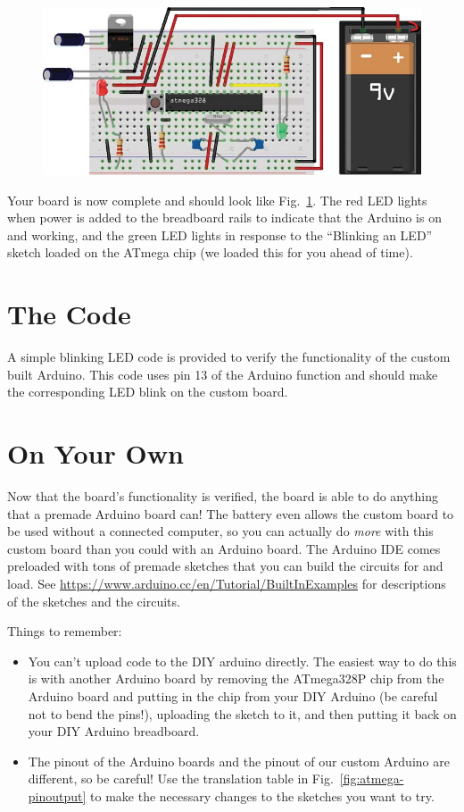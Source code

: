 \documentclass[11pt]{article}
\begin{document}
\begin{enumerate}
  \begin{figure}[H]
    \centering
    \includegraphics[width=.7\linewidth]{figures/build-6.png}
    \caption{\label{fig:build-6}}
  \end{figure}

\end{enumerate}

Your board is now complete and should look like Fig.~\ref{fig:build-6}.  The red LED
lights when power is added to the breadboard rails to indicate that the Arduino is on
and working, and the green LED lights in response to the ``Blinking an LED'' sketch
loaded on the ATmega chip (we loaded this for you ahead of time).


\section{The Code}
\label{sec-5}
A simple blinking LED code is provided to verify the functionality of the custom
built Arduino. This code uses pin 13 of the Arduino function and should make the
corresponding LED blink on the custom board.

\section{On Your Own}
\label{sec-6}
Now that the board's functionality is verified, the board is able to do anything that
a premade Arduino board can! The battery even allows the custom board to be used
without a connected computer, so you can actually do \emph{more} with this custom
board than you could with an Arduino board. The Arduino IDE comes preloaded with tons
of premade sketches that you can build the circuits for and load. See
\href{https://www.arduino.cc/en/Tutorial/BuiltInExamples}{https://www.arduino.cc/en/Tutorial/BuiltInExamples}
for descriptions of the sketches and the circuits.

Things to remember:

\begin{itemize}
\item You can't upload code to the DIY arduino directly. The easiest way to do this
  is with another Arduino board by removing the ATmega328P chip from the Arduino
  board and putting in the chip from your DIY Arduino (be careful not to bend the
  pins!), uploading the sketch to it, and then putting it back on your DIY Arduino
  breadboard. 
\item The pinout of the Arduino boards and the pinout of our custom Arduino are
  different, so be careful! Use the translation table in
  Fig.~\ref{fig:atmega-pinoutput} to make the necessary changes to the sketches you
  want to try.
\end{itemize}
\end{document}
